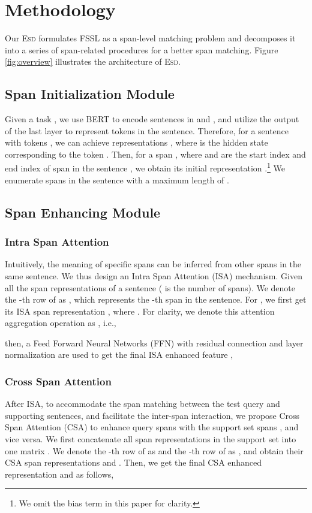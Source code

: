 \documentclass[11pt]{article}
\newcommand{\modelname}{\textsc{Esd}\xspace}
\begin{document}
 
\section{Methodology}
Our \modelname formulates FSSL as a span-level matching problem and decomposes it into a series of span-related procedures for a better span matching.
Figure \ref{fig:overview} illustrates the architecture of \modelname.

\subsection{Span Initialization Module}
Given a task , we use BERT \cite{Bert} to encode sentences in  and , and utilize the output of the last layer to represent tokens in the sentence.
Therefore, for a sentence with  tokens , we can achieve representations , where  is the hidden state corresponding to the token .
Then, for a span , where  and  are the start index and end index of span  in the sentence , we obtain its initial representation .\footnote{We omit the bias term in this paper for clarity.}
We enumerate spans in the sentence with a maximum length of .

\subsection{Span Enhancing Module}
\subsubsection{Intra Span Attention}
Intuitively, the meaning of specific spans can be inferred from other spans in the same sentence.
We thus design an Intra Span Attention (ISA) mechanism.
Given all the span representations of a sentence  ( is the number of spans).
We denote the -th row of  as , which represents the -th span in the sentence. 
For , we first get its ISA span representation 
,
where . 
For clarity, we denote this attention aggregation operation as , i.e., 

then, a Feed Forward Neural Networks (FFN) \cite{Transformer} with residual connection \cite{ResNet} and layer normalization \cite{LayerNorm} are used to get the final ISA enhanced feature ,


\subsubsection{Cross Span Attention}
After ISA, to accommodate the span matching between the test query and supporting sentences, and facilitate the inter-span interaction, we propose Cross Span Attention (CSA) to enhance query spans  with the support set spans , and vice versa.
We first concatenate all span representations in the support set into one matrix .
We denote the -th row of  as  and the -th row of  as , 
and obtain their CSA span representations
 and 
.
Then, we get the final CSA enhanced representation  and  as follows,
\end{document}
